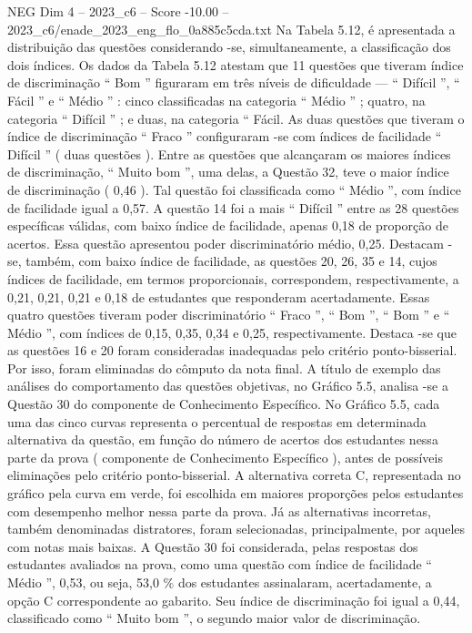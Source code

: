 \begin{textsample}{NEG Dim 4 – 2023\_c6 – Score -10.00 – 2023\_c6/enade\_2023\_eng\_flo\_0a885c5cda.txt}
Na Tabela 5.12, é apresentada a distribuição das questões considerando -se, simultaneamente, a classificação dos dois índices.
Os dados da Tabela 5.12 atestam que 11 questões que tiveram índice de discriminação “ Bom ” figuraram em três níveis de dificuldade — “ Difícil ”, “ Fácil ” e “ Médio ” : cinco classificadas na categoria “ Médio ” ; quatro, na categoria “ Difícil ” ; e duas, na categoria “ Fácil.
As duas questões que tiveram o índice de discriminação “ Fraco ” configuraram -se com índices de facilidade “ Difícil ” ( duas questões ).
Entre as questões que alcançaram os maiores índices de discriminação, “ Muito bom ”, uma delas, a Questão 32, teve o maior índice de discriminação ( 0,46 ).
Tal questão foi classificada como “ Médio ”, com índice de facilidade igual a 0,57.
A questão 14 foi a mais “ Difícil ” entre as 28 questões específicas válidas, com baixo índice de facilidade, apenas 0,18 de proporção de acertos.
Essa questão apresentou poder discriminatório médio, 0,25.
Destacam -se, também, com baixo índice de facilidade, as questões 20, 26, 35 e 14, cujos índices de facilidade, em termos proporcionais, correspondem, respectivamente, a 0,21, 0,21, 0,21 e 0,18 de estudantes que responderam acertadamente.
Essas quatro questões tiveram poder discriminatório “ Fraco ”, “ Bom ”, “ Bom ” e “ Médio ”, com índices de 0,15, 0,35, 0,34 e 0,25, respectivamente.
Destaca -se que as questões 16 e 20 foram consideradas inadequadas pelo critério ponto-bisserial.
Por isso, foram eliminadas do cômputo da nota final.
A título de exemplo das análises do comportamento das questões objetivas, no Gráfico 5.5, analisa -se a Questão 30 do componente de Conhecimento Específico.
No Gráfico 5.5, cada uma das cinco curvas representa o percentual de respostas em determinada alternativa da questão, em função do número de acertos dos estudantes nessa parte da prova ( componente de Conhecimento Específico ), antes de possíveis eliminações pelo critério ponto-bisserial.
A alternativa correta C, representada no gráfico pela curva em verde, foi escolhida em maiores proporções pelos estudantes com desempenho melhor nessa parte da prova.
Já as alternativas incorretas, também denominadas distratores, foram selecionadas, principalmente, por aqueles com notas mais baixas.
A Questão 30 foi considerada, pelas respostas dos estudantes avaliados na prova, como uma questão com índice de facilidade “ Médio ”, 0,53, ou seja, 53,0 \% dos estudantes assinalaram, acertadamente, a opção C correspondente ao gabarito.
Seu índice de discriminação foi igual a 0,44, classificado como “ Muito bom ”, o segundo maior valor de discriminação.

\end{textsample}
